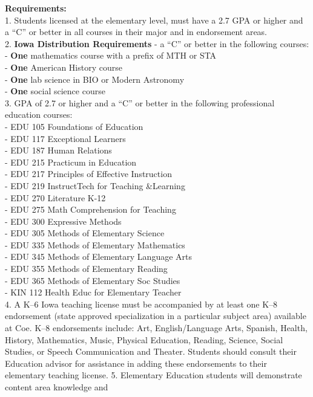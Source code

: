 \documentclass[
  letterpaper,
]{scrbook}
\begin{document}
\textbf{Requirements:}\\
1. Students licensed at the elementary level, must have a 2.7 GPA or
higher and a ``C'' or better in all courses in their major and in
endorsement areas.\\
2. \textbf{Iowa Distribution Requirements} - a ``C'' or better in the
following courses:\\
- \textbf{One} mathematics course with a prefix of MTH or STA\\
- \textbf{One} American History course\\
- \textbf{One} lab science in BIO or Modern Astronomy\\
- \textbf{One} social science course\\
3. GPA of 2.7 or higher and a ``C'' or better in the following
professional education courses:\\
- EDU 105 Foundations of Education\\
- EDU 117 Exceptional Learners\\
- EDU 187 Human Relations\\
- EDU 215 Practicum in Education\\
- EDU 217 Principles of Effective Instruction\\
- EDU 219 InstructTech for Teaching \&Learning\\
- EDU 270 Literature K-12\\
- EDU 275 Math Comprehension for Teaching\\
- EDU 300 Expressive Methods\\
- EDU 305 Methods of Elementary Science\\
- EDU 335 Methods of Elementary Mathematics\\
- EDU 345 Methods of Elementary Language Arts\\
- EDU 355 Methods of Elementary Reading\\
- EDU 365 Methods of Elementary Soc Studies\\
- KIN 112 Health Educ for Elementary Teacher\\
4. A K--6 Iowa teaching license must be accompanied by at least one K--8
endorsement (state approved specialization in a particular subject area)
available at Coe. K--8 endorsements include: Art, English/Language Arts,
Spanish, Health, History, Mathematics, Music, Physical Education,
Reading, Science, Social Studies, or Speech Communication and Theater.
Students should consult their Education advisor for assistance in adding
these endorsements to their elementary teaching license. 5. Elementary
Education students will demonstrate content area knowledge and
\end{document}
